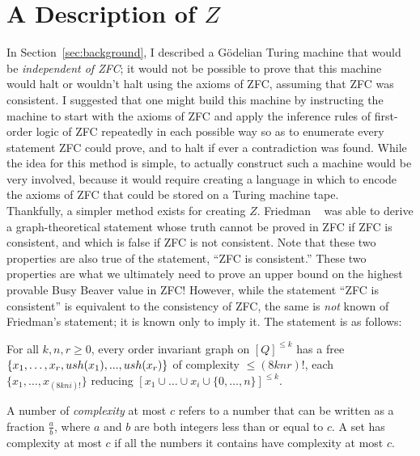 \section{A Description of $Z$}

In Section~\ref{sec:background}, I described a G\"{o}delian Turing machine that would be \emph{independent of ZFC}; it would not be possible to prove that this machine would halt or wouldn't halt using the axioms of ZFC, assuming that ZFC was consistent. I suggested that one might build this machine by instructing the machine to start with the axioms of ZFC and apply the inference rules of first-order logic of ZFC repeatedly in each possible way so as to enumerate every statement ZFC could prove, and to halt if ever a contradiction was found. While the idea for this method is simple, to actually construct such a machine would be very involved, because it would require creating a language in which to encode the axioms of ZFC that could be stored on a Turing machine tape. \\

Thankfully, a simpler method exists for creating $Z$. Friedman \cite{friedman}~
was able to derive a graph-theoretical statement whose truth cannot be proved in ZFC if ZFC is consistent, and which is false if ZFC is not consistent. Note that these two properties are also true of the statement, ``ZFC is consistent.'' These two properties are what we ultimately need to prove an upper bound on the highest provable Busy Beaver value in ZFC! However, while the statement ``ZFC is consistent'' is equivalent to the consistency of ZFC, the same is \emph{not} known of Friedman's statement; it is known only to imply it. The statement is as follows: \\

\begin{statement} \label{eq:friedman}
For all $k, n, r \ge 0$, every order invariant graph on $[Q]^{\le k}$ has a free $\{x_1,\dots,x_r, \\
ush(x_1),...,ush(x_r)\}$ of complexity $\le (8knr)!$, each $\{x_1, \dots, x_{(8kni)!}\}$
reducing $[x_1 \cup \dots \cup x_i \cup \{0,\dots,n\}]^{\le k}$. \cite{friedman}
\end{statement}

A number of \emph{complexity} at most $c$ refers to a number that can be written as a fraction $\frac{a}{b}$, where $a$ and $b$ are both integers less than or equal to $c$. A set has complexity at most $c$ if all the numbers it contains have complexity at most $c$. \\ 

